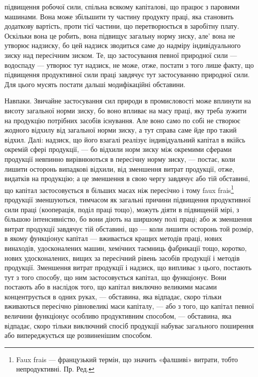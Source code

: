 \parcont{}  %
підвищення робочої сили, спільна всякому капіталові, що працює з паровими
машинами. Вона може збільшити ту частину продукту праці, яка становить
додаткову вартість, проти тієї частини, що перетворюється в заробітну плату.
Оскільки вона це робить, вона підвищує загальну норму зиску, але' вона не
утворює надзиску, бо цей надзиск зводиться саме до надміру індивідуального
зиску над пересічним зиском. Те, що застосування певної природної сили — водоспаду
— утворює тут надзиск, не може, отже, постати з того лише факту, що
підвищення продуктивної сили праці завдячує тут застосуванню природної сили.
Для цього мусять постати дальші модифікаційні обставини.

Навпаки. Звичайне застосування сил природи в промисловості може вплинути
на висоту загальної норми зиску, бо воно впливає на масу праці, яку
треба зужити на продукцію потрібних засобів існування. Але воно само по собі не
створює жодного відхилу від загальної норми зиску, а тут справа саме йде
про такий відхил. Далі: надзиск, що його взагалі реалізує індивідуальний капітал
в якійсь окремій сфері продукції, — бо відхили норм зиску між окремими сферами
продукції невпинно вирівнюються в пересічну норму зиску, — постає, коли лишити
осторонь випадкові відхили, від зменшення витрат продукції, отже, видатків на
продукцію; а це зменшення в свою чергу завдячує або тій обставині, що
капітал застосовується в більших масах ніж пересічно і тому faux frais\footnote*{
Faux frais — французький термін, що значить «фалшиві» витрати, тобто непродуктивні. Пр. Ред.
}
продукції зменшуються, тимчасом як загальні причини підвищення продуктивної
сили праці (кооперація, поділ праці тощо), можуть діяти в підвищеній мірі, з
більшою інтенсивністю, бо вони діють на ширшому полі праці; або ж зменшення
витрат продукції завдячує тій обставині, що — коли лишити осторонь той розмір,
в якому функціонує капітал — вживається кращих методів праці, нових винаходів,
удосконалених машин, хемічних таємниць фабрикації тощо, коротко, нових
удосконалених, вищих за пересічний рівень засобів продукції і методів продукції.
Зменшення витрат продукції і надзиск, що випливає з цього, постають тут
з того способу, що ним застосовується капітал, що функціонує. Вони постають
або в наслідок того, що капітал виключно великими масами концентрується в
одних руках, — обставина, яка відпадає, скоро тільки вживаються пересічно
рівновеликі маси капіталу, — або з того, що капітал певної величини функціонує
особливо продуктивним способом, — обставина, яка відпадає, скоро тільки
виключний спосіб продукції набуває загального поширення або випереджується
ще розвиненішим способом.

